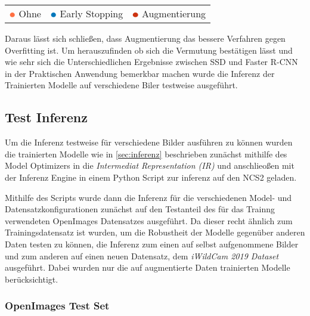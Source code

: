 \begin{table}[htb]
  \centering
  \begin{tabular}{m{}<{\centering}m{}<{\centering}m{}<{\centering}}
    $\color[HTML]{FF7043}\medbullet$  Ohne & $\color[HTML]{0077BB}\medbullet$  Early Stopping & $\color[HTML]{CC3311}\medbullet$  Augmentierung
  \end{tabular}    
\end{table}


Daraus lässt sich schließen, dass Augmentierung das 
bessere Verfahren gegen Overfitting ist. Um herauszufinden 
ob sich die Vermutung bestätigen lässt und wie sehr sich 
die Unterschiedlichen Ergebnisse zwischen SSD und 
Faster R-CNN in der Praktischen Anwendung bemerkbar 
machen wurde die Inferenz der Trainierten Modelle auf 
verschiedene Biler testweise ausgeführt.




\subsection{Test Inferenz}\label{sec:test_inferenz}

Um die Inferenz testweise für verschiedene Bilder ausführen zu 
können wurden die trainierten Modelle wie in \ref{sec:inferenz}
beschrieben zunächst mithilfe des Model Optimizers in die 
\textit{Intermediat Representation (IR)} und anschlieoßen 
mit der Inferenz Engine in einem Python Script zur 
inferenz auf den NCS2 geladen.

Mithilfe des Scripts wurde dann die Inferenz für die 
verschiedenen Model- und Datensatzkonfigurationen
zunächst auf den Testanteil des für das Trainng verwendeten 
OpenImages Datensatzes ausgeführt.
Da dieser recht ähnlich zum Trainingsdatensatz ist 
wurden, um die Robustheit der Modelle gegenüber anderen 
Daten testen zu können, die Inferenz zum einen auf selbst
aufgenommene Bilder und zum anderen auf einen neuen Datensatz,
dem \textit{iWildCam 2019 Dataset} \cite{beery2019iwildcam}
ausgeführt. Dabei wurden nur die auf augmentierte Daten trainierten 
Modelle berücksichtigt. 




\subsubsection{OpenImages Test Set}

